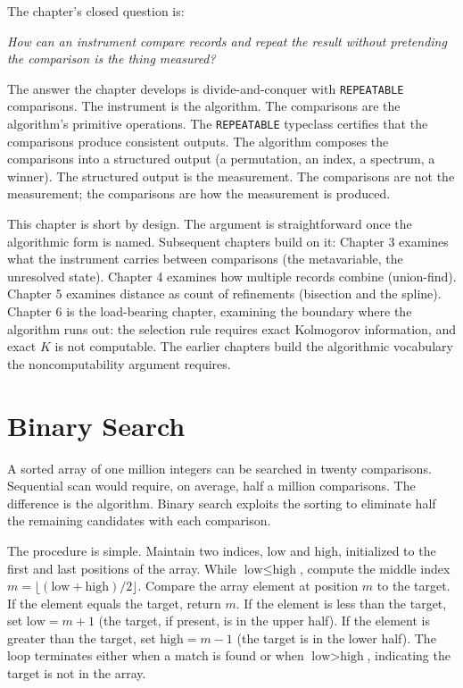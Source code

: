 \begin{chapteressay}
The chapter's closed question is:

\begin{center}
\emph{How can an instrument compare records and repeat the result
without pretending the comparison is the thing measured?}
\end{center}

The answer the chapter develops is divide-and-conquer with
\texttt{REPEATABLE} comparisons. The instrument is the algorithm.
The comparisons are the algorithm's primitive operations. The
\texttt{REPEATABLE} typeclass certifies that the comparisons
produce consistent outputs. The algorithm composes the comparisons
into a structured output (a permutation, an index, a spectrum, a
winner). The structured output is the measurement. The comparisons
are not the measurement; the comparisons are how the measurement
is produced.

This chapter is short by design. The argument is straightforward
once the algorithmic form is named. Subsequent chapters build on it:
Chapter 3 examines what the instrument carries between comparisons
(the metavariable, the unresolved state). Chapter 4 examines how
multiple records combine (union-find). Chapter 5 examines distance
as count of refinements (bisection and the spline). Chapter 6 is
the load-bearing chapter, examining the boundary where the algorithm
runs out: the selection rule requires exact Kolmogorov information,
and exact $K$ is not computable. The earlier chapters build the
algorithmic vocabulary the noncomputability argument requires.

\end{chapteressay}

\section{Binary Search}
\label{se:binary-search}

A sorted array of one million integers can be searched in twenty comparisons.
Sequential scan would require, on average, half a million comparisons. The
difference is the algorithm. Binary search exploits the sorting to eliminate
half the remaining candidates with each comparison.

The procedure is simple. Maintain two indices, $\text{low}$ and $\text{high}$,
initialized to the first and last positions of the array. While
$\text{low} \le \text{high}$, compute the middle index $m = \lfloor
(\text{low} + \text{high}) / 2 \rfloor$. Compare the array element at
position $m$ to the target. If the element equals the target, return $m$.
If the element is less than the target, set $\text{low} = m + 1$ (the
target, if present, is in the upper half). If the element is greater than
the target, set $\text{high} = m - 1$ (the target is in the lower half).
The loop terminates either when a match is found or when
$\text{low} > \text{high}$, indicating the target is not in the array.

